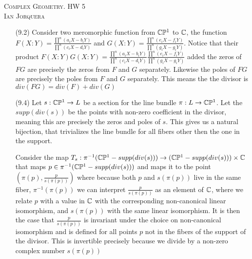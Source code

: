 \documentclass[12pt]{amsart}
\begin{document}
\begin{center}
    \textsc{Complex Geometry. HW 5\\ Ian Jorquera}
\end{center}
\vspace{1em}
\begin{itemize}
    \item[(9.2)] Consider two meromorphic function from $\mathbb{C}\mathbb{P}^1$ to $\mathbb{C}$, the function 
    $F(X:Y)=\frac{\prod^n(a_iX-b_iY)}{\prod^n(c_iX-d_iY)}$ and 
    $G(X:Y)=\frac{\prod^n(e_iX-f_iY)}{\prod^n(g_iX-g_iY)}$. Notice that their product
    $F(X:Y)G(X:Y)=\frac{\prod^n(a_iX-b_iY)}{\prod^n(c_iX-d_iY)}\frac{\prod^n(e_iX-f_iY)}{\prod^n(g_iX-g_iY)}$
    added the zeros of $FG$ are precisely the zeros from $F$ and $G$ separately. Likewise the poles
    of $FG$ are precisely the poles from $F$ and $G$ separately. This means the the divisor is
    $div(FG)=div(F)+div(G)$

    \item[(9.4)] Let $s:\mathbb{C}\mathbb{P}^1\rightarrow L$ be a section for the line bundle $\pi:L\rightarrow \mathbb{C}\mathbb{P}^1$. 
    Let the $supp(div(s))$ be the points with non-zero coefficient in the divisor, 
    meaning this are precisely the zeros and poles of $s$. This gives us a natural bijection, 
    that trivializes the line bundle for all fibers other then the one in the support.

    Consider the map $T_s:\pi^{-1}(\mathbb{C}\mathbb{P}^1-supp(div(s)))\rightarrow (\mathbb{C}\mathbb{P}^1-supp(div(s)))\times \mathbb{C}$
    that maps $p\in \pi^{-1}(\mathbb{C}\mathbb{P}^1-supp(div(s)))$ and maps it to the point $(\pi(p), \frac{p}{s(\pi(p))})$ 
    where because both $p$ and $s(\pi(p))$ live in the same fiber, $\pi^{-1}(\pi(p))$ we can interpret 
    $\frac{p}{s(\pi(p))}$ as an element of $\mathbb{C}$, where we relate $p$ with a value in $\mathbb{C}$ with 
    the corresponding non-canonical linear isomorphism, and $s(\pi(p))$ with the same linear isomorphism. 
    It is then the case that $\frac{p}{s(\pi(p))}$ is invariant under the choice on non-canonical isomorphism 
    and is defined for all points $p$ not in the fibers of the support of the divisor. This is invertible precisely 
    because we divide by a non-zero complex number $s(\pi(p))$
\end{itemize}
\end{document}
